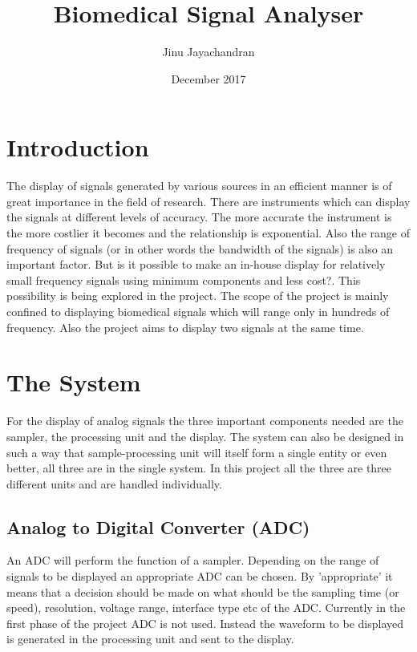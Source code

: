 \documentclass[12pt, a4paper, twoside]{article}
\title{Biomedical Signal Analyser}
\author{Jinu Jayachandran}
\date{December 2017}
\begin{document}
 
\begin{titlepage}
\maketitle
\end{titlepage}
\tableofcontents
\newpage
\listoffigures
\newpage
\section{Introduction}
    The display of signals generated by various sources in an efficient manner is of great importance in the field of research. There are instruments which can display the signals at different levels of accuracy. The more accurate the instrument is the more costlier it becomes and the relationship is exponential. Also the range of frequency of signals (or in other words the bandwidth of the signals) is also an important factor. But is it possible to make an in-house display for relatively small frequency signals using minimum components and less cost?. This possibility is being explored in the project. The scope of the project is mainly confined to displaying biomedical signals which will range only in hundreds of frequency. Also the project aims to display two signals at the same time.
    
\section{The System}
    For the display of analog signals the three important components needed are the sampler, the processing unit and the display. The system can also be designed in such a way that sample-processing unit will itself form a single entity or even better, all three are in the single system. In this project all the three are three different units and are handled individually. 

\subsection{Analog to Digital Converter (ADC)}
    An ADC will perform the function of a sampler. Depending on the range of signals to be displayed an appropriate ADC can be chosen. By 'appropriate' it means that a decision should be made on what should be the sampling time (or speed), resolution, voltage range, interface type etc of the ADC. Currently in the first phase of the project ADC is not used. Instead the waveform to be displayed is generated in the processing unit and sent to the display.
\end{document}

